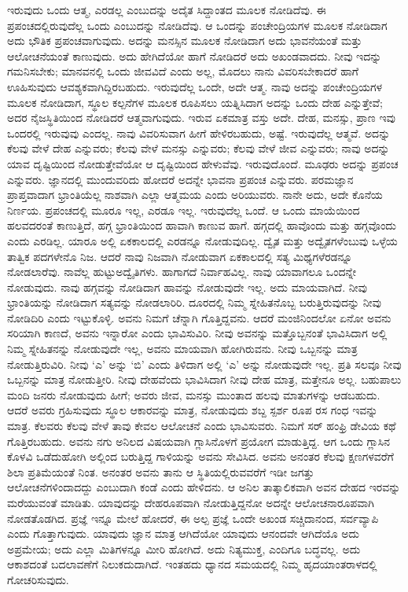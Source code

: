 ಇರುವುದು ಒಂದು ಆತ್ಮ, ಎರಡಲ್ಲ ಎಂಬುದನ್ನು ಅದೈತ ಸಿದ್ದಾಂತದ ಮೂಲಕ ನೋಡಿದೆವು. ಈ ಪ್ರಪಂಚದಲ್ಲಿರುವುದೆಲ್ಲ ಒಂದು ಎಂಬುದನ್ನು ನೋಡಿದೆವು. ಆ ಒಂದನ್ನು ಪಂಚೇಂದ್ರಿಯಗಳ ಮೂಲಕ ನೋಡಿದಾಗ ಅದು ಭೌತಿಕ ಪ್ರಪಂಚವಾಗುವುದು. ಅದನ್ನು ಮನಸ್ಸಿನ ಮೂಲಕ ನೋಡಿದಾಗ ಅದು ಭಾವನೆಯಂತೆ ಮತ್ತು ಆಲೋಚನೆಯಂತೆ ಕಾಣುವುದು. ಅದು ಹೇಗಿದೆಯೋ ಹಾಗೆ ನೋಡಿದರೆ ಅದು ಅಖಂಡವಾದದು. ನೀವು ಇದನ್ನು ಗಮನಿಸಬೇಕು; ಮಾನವನಲ್ಲಿ ಒಂದು ಜೀವವಿದೆ ಎಂದು ಅಲ್ಲ, ಮೊದಲು ನಾನು ವಿವರಿಸಬೇಕಾದರೆ ಹಾಗೆ ಊಹಿಸುವುದು ಆವಶ್ಯಕವಾಗಿದ್ದಿರಬಹುದು. ಇರುವುದೆಲ್ಲ ಒಂದೇ, ಅದೇ ಆತ್ಮ. ನಾವು ಅದನ್ನು ಪಂಚೇಂದ್ರಿಯಗಳ ಮೂಲಕ ನೋಡಿದಾಗ, ಸ್ಥೂಲ ಕಲ್ಪನೆಗಳ ಮೂಲಕ ರೂಪಿಸಲು ಯತ್ನಿಸಿದಾಗ ಅದನ್ನು ಒಂದು ದೇಹ ಎನ್ನುತ್ತೇವೆ; ಅದರ ನೈಜಸ್ಥಿತಿಯಿಂದ ನೋಡಿದರೆ ಆತ್ಮವಾಗುವುದು. ಇರುವ ಏಕಮಾತ್ರ ವಸ್ತು ಅದೇ. ದೇಹ, ಮನಸ್ಸು, ಪ್ರಾಣ ಇವು ಒಂದರಲ್ಲಿ ಇರುವುವು ಎಂದಲ್ಲ. ನಾವು ವಿವರಿಸುವಾಗ ಹೀಗೆ ಹೇಳಿರಬಹುದು, ಅಷ್ಟೆ. ಇರುವುದೆಲ್ಲ ಆತ್ಮವೆ. ಅದನ್ನು ಕೆಲವು ವೇಳೆ ದೇಹ ಎನ್ನುವರು; ಕೆಲವು ವೇಳೆ ಮನಸ್ಸು ಎನ್ನುವರು; ಕೆಲವು ವೇಳೆ ಜೀವ ಎನ್ನುವರು; ನಾವು ಅದನ್ನು ಯಾವ ದೃಷ್ಟಿಯಿಂದ ನೋಡುತ್ತೇವೆಯೋ ಆ ದೃಷ್ಟಿಯಿಂದ ಹೇಳುವೆವು. ಇರುವುದೊಂದೆ. ಮೂಢರು ಅದನ್ನು ಪ್ರಪಂಚ ಎನ್ನುವರು. ಜ್ಞಾನದಲ್ಲಿ ಮುಂದುವರಿದು ಹೋದರೆ ಅದನ್ನೇ ಭಾವನಾ ಪ್ರಪಂಚ ಎನ್ನುವರು. ಪರಮಜ್ಞಾನ ಪ್ರಾಪ್ತವಾದಾಗ ಭ್ರಾಂತಿಯೆಲ್ಲ ನಾಶವಾಗಿ ಎಲ್ಲಾ ಆತ್ಮಮಯ ಎಂದು ಅರಿಯುವರು. ನಾನೇ ಅದು, ಅದೇ ಕೊನೆಯ ನಿರ್ಣಯ. ಪ್ರಪಂಚದಲ್ಲಿ ಮೂರೂ ಇಲ್ಲ, ಎರಡೂ ಇಲ್ಲ. ಇರುವುದೆಲ್ಲ ಒಂದೆ. ಆ ಒಂದು ಮಾಯೆಯಿಂದ ಹಲವದರಂತೆ ಕಾಣುತ್ತಿದೆ, ಹಗ್ಗ ಭ್ರಾಂತಿಯಿಂದ ಹಾವಾಗಿ ಕಾಣುವ ಹಾಗೆ. ಹಗ್ಗದಲ್ಲಿ ಹಾವೊಂದು ಮತ್ತು ಹಗ್ಗವೊಂದು ಎಂದು ಎರಡಿಲ್ಲ. ಯಾರೂ ಅಲ್ಲಿ ಏಕಕಾಲದಲ್ಲಿ ಎರಡನ್ನೂ ನೋಡುವುದಿಲ್ಲ. ದ್ವೈತ ಮತ್ತು ಅದ್ವೈತಗಳೆಂಬುವು ಒಳ್ಳೆಯ ತಾತ್ವಿಕ ಪದಗಳೇನೊ ನಿಜ. ಆದರೆ ನಾವು ನಿಜವಾಗಿ ನೋಡುವಾಗ ಏಕಕಾಲದಲ್ಲಿ ಸತ್ಯ ಮಿಥ್ಯಗಳೆರಡನ್ನೂ ನೋಡಲಾರೆವು. ನಾವೆಲ್ಲ ಹುಟ್ಟು\break ಅದ್ವೈತಿಗಳು. ಹಾಗಾಗದೆ ನಿರ್ವಾಹವಿಲ್ಲ. ನಾವು ಯಾವಾಗಲೂ ಒಂದನ್ನೇ ನೋಡುವುದು. ನಾವು ಹಗ್ಗವನ್ನು ನೋಡಿದಾಗ ಹಾವನ್ನು ನೋಡುವುದೇ ಇಲ್ಲ. ಅದು ಮಾಯವಾಗಿದೆ. ನೀವು ಭ್ರಾಂತಿಯನ್ನು ನೋಡಿದಾಗ ಸತ್ಯವನ್ನು ನೋಡಲಾರಿರಿ. ದೂರದಲ್ಲಿ ನಿಮ್ಮ ಸ್ನೇಹಿತನೊಬ್ಬ ಬರುತ್ತಿರುವುದನ್ನು ನೀವು ನೋಡಿದಿರಿ ಎಂದು ಇಟ್ಟುಕೊಳ್ಳಿ. ಅವನು ನಿಮಗೆ ಚೆನ್ನಾಗಿ ಗೊತ್ತಿದ್ದವನು. ಆದರೆ ಮಂಜಿನಿಂದಲೋ ಏನೋ ಅವನು ಸರಿಯಾಗಿ ಕಾಣದೆ, ಅವನು ಇನ್ನಾರೋ ಎಂದು ಭಾವಿಸುವಿರಿ. ನೀವು ಅವನನ್ನು ಮತ್ತೊಬ್ಬನಂತೆ ಭಾವಿಸಿದಾಗ ಅಲ್ಲಿ ನಿಮ್ಮ ಸ್ನೇಹಿತನನ್ನು ನೋಡುವುದೇ ಇಲ್ಲ, ಅವನು ಮಾಯವಾಗಿ ಹೋಗಿರುವನು. ನೀವು ಒಬ್ಬನನ್ನು ಮಾತ್ರ ನೋಡುತ್ತಿರುವಿರಿ. ನೀವು `ಎ' ಅನ್ನು `ಬಿ' ಎಂದು ತಿಳಿದಾಗ ಅಲ್ಲಿ `ಎ' ಅನ್ನು ನೋಡುವುದೇ ಇಲ್ಲ. ಪ್ರತಿ ಸಲವೂ ನೀವು ಒಬ್ಬನನ್ನು ಮಾತ್ರ ನೋಡುತ್ತೀರಿ. ನೀವು ದೇಹವೆಂದು ಭಾವಿಸಿದಾಗ ನೀವು ದೇಹ ಮಾತ್ರ, ಮತ್ತೇನೂ ಅಲ್ಲ. ಬಹುಪಾಲು ಮಂದಿ ಜನರು ನೋಡುವುದು ಹೀಗೆ; ಅವರು ಜೀವ, ಮನಸ್ಸು ಮುಂತಾದ ಹಲವು ಮಾತುಗಳನ್ನು ಆಡಬಹುದು. ಆದರೆ ಅವರು ಗ್ರಹಿಸುವುದು ಸ್ಥೂಲ ಆಕಾರವನ್ನು ಮಾತ್ರ, ನೋಡುವುದು ಶಬ್ದ ಸ್ಪರ್ಶ ರೂಪ ರಸ ಗಂಧ ಇವನ್ನು ಮಾತ್ರ. ಕೆಲವರು ಕೆಲವು ವೇಳೆ ತಾವು ಕೇವಲ ಆಲೋಚನೆ ಎಂದು ಭಾವಿಸುವರು. ನಿಮಗೆ ಸರ್ ಹಂಫ್ರಿ ಡೇವಿಯ ಕಥೆ ಗೊತ್ತಿರಬಹುದು. ಅವನು ನಗು ಅನಿಲದ ವಿಷಯವಾಗಿ ಗ್ಲಾಸಿನೊಳಗೆ ಪ್ರಯೋಗ ಮಾಡುತ್ತಿದ್ದ. ಆಗ ಒಂದು ಗ್ಲಾಸಿನ ಕೊಳವಿ ಒಡೆದುಹೋಗಿ ಅಲ್ಲಿಂದ ಬರುತ್ತಿದ್ದ ಗಾಳಿಯನ್ನು ಅವನು ಸೇವಿಸಿದ. ಅವನು ಅನಂತರ ಕೆಲವು ಕ್ಷಣಗಳವರೆಗೆ ಶಿಲಾ ಪ್ರತಿಮೆಯಂತೆ ನಿಂತ. ಅನಂತರ ಅವನು ತಾನು ಆ ಸ್ಥಿತಿಯಲ್ಲಿರುವವರೆಗೆ ಇಡೀ ಜಗತ್ತು ಆಲೋಚನೆಗಳಿಂದಾದದ್ದು ಎಂಬುದಾಗಿ ಕಂಡೆ ಎಂದು ಹೇಳಿದನು. ಆ ಅನಿಲ ತಾತ್ಕಾಲಿಕವಾಗಿ ಅವನ ದೇಹದ ಇರವನ್ನು ಮರೆಯುವಂತೆ ಮಾಡಿತು. ಯಾವುದನ್ನು ದೇಹರೂಪವಾಗಿ ನೋಡುತ್ತಿದ್ದನೋ ಅದನ್ನೇ ಆಲೋಚನಾರೂಪವಾಗಿ ನೋಡತೊಡಗಿದ. ಪ್ರಜ್ಞೆ ಇನ್ನೂ ಮೇಲೆ ಹೋದರೆ, ಈ ಅಲ್ಪ ಪ್ರಜ್ಞೆ ಒಂದೇ ಅಖಂಡ ಸಚ್ಚಿದಾನಂದ, ಸರ್ವವ್ಯಾಪಿ ಎಂದು ಗೊತ್ತಾಗುವುದು. ಯಾವುದು ಜ್ಞಾನ ಮಾತ್ರ ಆಗಿದೆಯೋ ಯಾವುದು ಆನಂದವೇ ಆಗಿದೆಯೊ ಅದು ಅಪ್ರಮೇಯ; ಅದು ಎಲ್ಲಾ ಮಿತಿಗಳನ್ನೂ ಮೀರಿ ಹೋಗಿದೆ. ಅದು ನಿತ್ಯಮುಕ್ತ, ಎಂದಿಗೂ ಬದ್ಧವಲ್ಲ. ಅದು ಆಕಾಶದಂತೆ ಬದಲಾವಣೆಗೆ ನಿಲುಕದುದಾಗಿದೆ. ಇಂತಹದು ಧ್ಯಾನದ ಸಮಯದಲ್ಲಿ ನಿಮ್ಮ ಹೃದಯಾಂತರಾಳದಲ್ಲಿ ಗೋಚರಿಸುವುದು.

